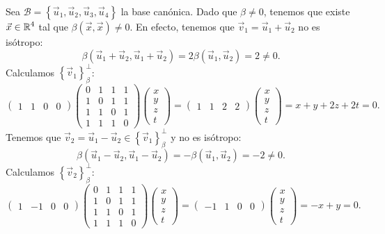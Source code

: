 \documentclass{article}
\begin{document}
\begin{sol}
	Sea $\displaystyle \mathcal{B} = \left\{ \vec{u}_{1}, \vec{u}_{2}, \vec{u}_{3}, \vec{u}_{4}\right\}  $ la base canónica. Dado que $\displaystyle \beta \neq 0 $, tenemos que existe $\displaystyle \vec{x} \in \mathbb{R}^{4} $ tal que $\displaystyle \beta\left(\vec{x}, \vec{x}\right) \neq 0 $. En efecto, tenemos que $\displaystyle \vec{v}_{1} = \vec{u}_{1} + \vec{u}_{2} $ no es isótropo: 
	\[\beta\left(\vec{u}_{1} + \vec{u}_{2}, \vec{u}_{1} + \vec{u}_{2}\right) = 2\beta\left(\vec{u}_{1}, \vec{u}_{2}\right) = 2 \neq 0 .\]
	Calculamos $\displaystyle \left\{ \vec{v}_{1}\right\} ^{\perp }_{\beta } $:
	\[\begin{pmatrix} 1 & 1 & 0 & 0 \end{pmatrix}\begin{pmatrix} 0 & 1 & 1 & 1 \\
1 & 0 & 1 & 1 \\
1 & 1 & 0 & 1 \\
1 & 1 & 1 & 0\end{pmatrix}\begin{pmatrix} x \\ y \\ z \\ t \end{pmatrix} = \begin{pmatrix} 1 & 1 & 2 & 2 \end{pmatrix}\begin{pmatrix} x \\ y \\ z \\ t \end{pmatrix} = \boxed{x + y + 2z + 2t = 0} .\]
Tenemos que $\displaystyle \vec{v}_{2} = \vec{u}_{1}-\vec{u}_{2} \in \left\{ \vec{v}_{1}\right\} ^{\perp }_{\beta } $ y no es isótropo:
\[\beta\left(\vec{u}_{1}-\vec{u}_{2}, \vec{u}_{1}-\vec{u}_{2}\right) = -\beta\left(\vec{u}_{1}, \vec{u}_{2}\right) = - 2 \neq 0 .\]
Calculamos $\displaystyle \left\{ \vec{v}_{2}\right\} ^{\perp }_{\beta }$:
\[ \begin{pmatrix} 1 & - 1 & 0 & 0 \end{pmatrix}\begin{pmatrix} 0 & 1 & 1 & 1 \\
1 & 0 & 1 & 1 \\
1 & 1 & 0 & 1 \\
1 & 1 & 1 & 0\end{pmatrix}\begin{pmatrix} x \\ y \\ z \\ t \end{pmatrix} = \begin{pmatrix} -1 & 1 & 0 & 0 \end{pmatrix}\begin{pmatrix} x \\ y \\ z \\ t \end{pmatrix} = \boxed{- x + y = 0} .\]

\end{sol}
\end{document}
